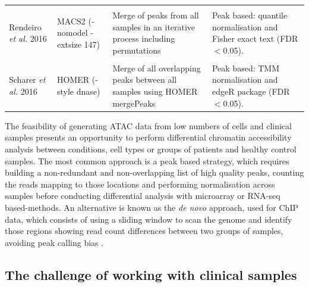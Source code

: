 \begin{landscape}
\begin{center}
\begin{longtable}[ht]{p{.20\textheight} p{.40\textheight} p{.40\textheight} p{.40\textheight}}
 &&&\\  						
Rendeiro \textit{et al.} 2016 & MACS2 (-nomodel -extsize 147)	& Merge of peaks from all samples in an iterative process including permutations & Peak based: quantile normalisation and Fisher exact text (FDR$<$0.05). \\
 &&&\\  
Scharer \textit{et al.} 2016 & HOMER (-style dnase) & Merge of all overlapping peaks between all samples using HOMER mergePeaks & Peak based: TMM normalisation and edgeR package (FDR$<$0.05). \\														   
\bottomrule
\end{longtable}
\end{center}
\end{landscape}


The feasibility of generating ATAC data from low numbers of cells and clinical samples presents an opportunity to perform differential chromatin accessibility analysis between conditions, cell types or groups of patients and healthy control samples. The most common approach is a peak based strategy, which requires building a non-redundant and non-overlapping list of high quality peaks, counting the reads mapping to those locations and performing normalisation across samples before conducting differential analysis with microarray or RNA-seq based-methods. An alternative is known as the \textit{de novo} approach, used for ChIP data, which consists of using a sliding window to scan the genome and identify those regions showing read count differences between two groups of samples, avoiding peak calling bias \parencite{Shen2013}.     


\subsection{The challenge of working with clinical samples}

